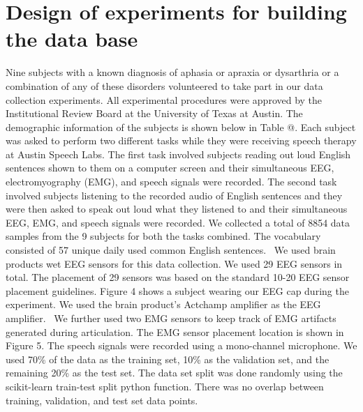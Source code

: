 \documentclass[letterpaper, 10 pt, conference]{ieeeconf}  %
\makeatletter
\newcommand*{\rom}[1]{\expandafter\@slowromancap\romannumeral #1@}
\makeatother
\begin{document}
\section{Design of experiments for building the data base}

Nine subjects with a known diagnosis of aphasia or apraxia or dysarthria or a combination of any of these disorders volunteered to take part in our data collection experiments. All experimental procedures were approved by the Institutional Review Board at the University of Texas at Austin. The demographic information of the subjects is shown below in Table \rom{1}. Each subject was asked to perform two different tasks while they were receiving speech therapy at Austin Speech Labs. The first task involved subjects reading out loud English sentences shown to them on a computer screen and their simultaneous EEG, electromyography (EMG), and speech signals were recorded. The second task involved subjects listening to the recorded audio of English sentences and they were then asked to speak out loud what they listened to and their simultaneous EEG, EMG, and speech signals were recorded. We collected a total of 8854 data samples from the 9 subjects for both the tasks combined. The vocabulary consisted of 57 unique daily used common English sentences.  We used brain products wet EEG sensors for this data collection. We used 29 EEG sensors in total. The placement of 29 sensors was based on the standard 10-20 EEG sensor placement guidelines. Figure 4 shows a subject wearing our EEG cap during the experiment. We used the brain product's Actchamp amplifier as the EEG amplifier. 
We further used two EMG sensors to keep track of EMG artifacts generated during articulation. The EMG sensor placement location is shown in Figure 5. The speech signals were recorded using a mono-channel microphone. We used 70\% of the data as the training set, 10\% as the validation set, and the remaining 20\% as the test set. The data set split was done randomly using the scikit-learn train-test split python function. There was no overlap between training, validation, and test set data points. 
\end{document}
